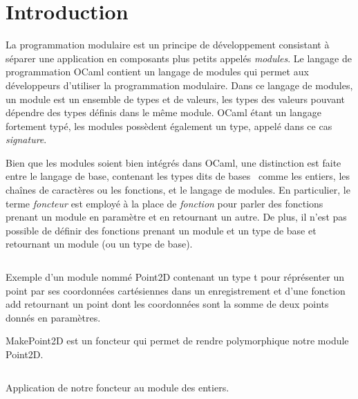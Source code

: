 \chapter*{Introduction}

La programmation modulaire est un principe de développement consistant à séparer une
application en composants plus petits appelés \textit{modules}. Le langage de
programmation OCaml contient un langage de modules qui permet aux développeurs
d'utiliser la programmation modulaire. Dans ce langage de modules, un module est
un ensemble de types et de valeurs, les types des valeurs pouvant dépendre des
types définis dans le même module.
OCaml étant un langage fortement typé, les modules possèdent également
un type, appelé dans ce cas \textit{signature}.


Bien que les modules soient bien intégrés dans OCaml, une
distinction est faite entre le langage de base, contenant les types dits \og de
bases \fg \, comme les entiers, les chaînes de caractères ou les fonctions, et le
langage de modules. En particulier, le terme \textit{foncteur} est employé à la
place de \textit{fonction} pour parler des fonctions prenant un module en
paramètre et en retournant un autre. De plus, il n'est pas possible de définir
des fonctions prenant un module et un type de base et retournant un module (ou un
type de base).

\renewcommand\listingscaption{Code OCaml}

\begin{listing}
  \inputminted{OCaml}{codes/intro_point2D.ml}
  \caption{Exemple d'un module nommé Point2D contenant un type t pour
    réprésenter un point par ses coordonnées cartésiennes dans un enregistrement
    et d'une fonction add retournant un point dont les coordonnées sont
    la somme de deux points donnés en paramètres.}
\end{listing}

\begin{listing}
  \caption{MakePoint2D est un foncteur qui permet de rendre polymorphique notre
    module Point2D.}
  \inputminted{OCaml}{codes/intro_point2D_polymorphic.ml}
\end{listing}

\begin{listing}
  \caption{Application de notre foncteur au module des entiers.}
  \inputminted{OCaml}{codes/intro_point2D_polymorphic_app.ml}
\end{listing}

